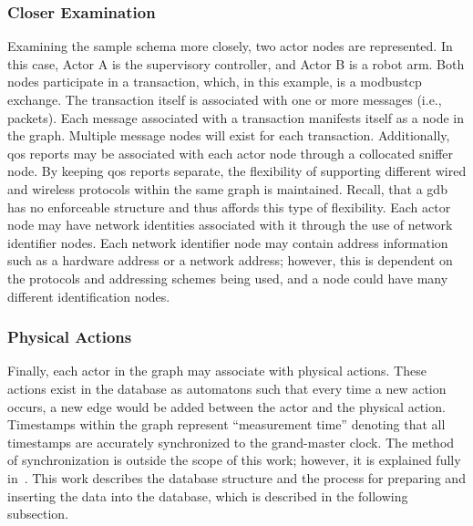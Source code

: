 \subsubsection{Closer Examination}
Examining the sample schema more closely, two actor nodes are represented.  In this case, Actor A is the supervisory controller, and Actor B is a robot arm.  Both nodes participate in a transaction, which, in this example, is a \gls{modbustcp} exchange. The transaction itself is associated with one or more messages (i.e., packets). Each message associated with a transaction manifests itself as a node in the graph. Multiple message nodes will exist for each transaction. 
Additionally, \gls{qos} reports may be associated with each actor node through a collocated sniffer node.  By keeping \gls{qos} reports separate, the flexibility of supporting different wired and wireless protocols within the same graph is maintained. Recall, that a \gls{gdb} has no enforceable structure and thus affords this type of flexibility. Each actor node may have network identities associated with it through the use of network identifier nodes.  Each network identifier node may contain address information such as a hardware address or a network address; however, this is dependent on the protocols and addressing schemes being used, and a node could have many different identification nodes. 
\subsubsection{Physical Actions}
Finally, each actor in the graph may associate with physical actions.  These actions exist in the database as automatons such that every time a new action occurs, a new edge would be added between the actor and the physical action.  Timestamps within the graph represent ``measurement time'' denoting that all  timestamps are accurately synchronized to the grand-master clock.  The method of synchronization is outside the scope of this work; however, it is explained fully in~\cite{Liu2019vancouver}.  This work describes the database structure and the process for preparing and inserting the data into the database, which is described in the following subsection.


